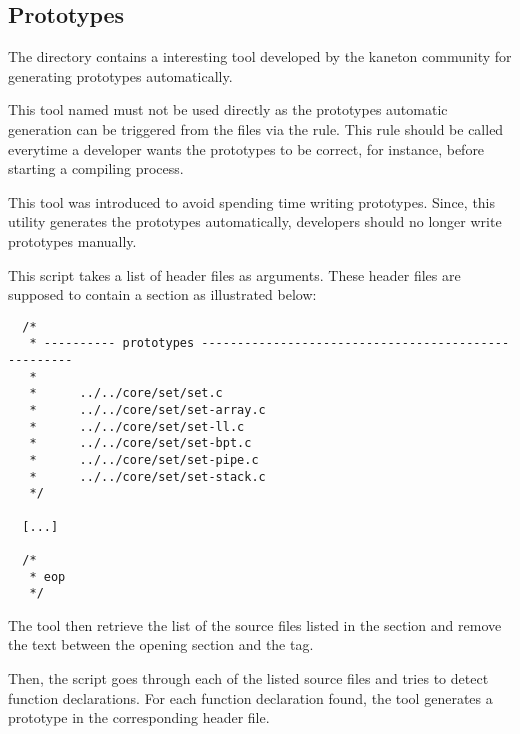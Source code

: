 %
%
%
%
%
%

%
%

\subsection{Prototypes}
\label{section:prototypes}

The  directory contains a interesting tool developed by
the kaneton community for generating  prototypes automatically.

This tool named  must not be used directly as the prototypes
automatic generation can be triggered from the  files via the
 rule. This rule should be called everytime a developer
wants the prototypes to be correct, for instance, before starting a compiling
process.

This tool was introduced to avoid spending time writing prototypes.
Since, this utility generates the prototypes automatically, developers
should no longer write prototypes manually.

This script takes a list of  header files as arguments. These header
files are supposed to contain a  section as illustrated
below:

\begin{verbatim}
  /*
   * ---------- prototypes ----------------------------------------------------
   *
   *      ../../core/set/set.c
   *      ../../core/set/set-array.c
   *      ../../core/set/set-ll.c
   *      ../../core/set/set-bpt.c
   *      ../../core/set/set-pipe.c
   *      ../../core/set/set-stack.c
   */

  [...]

  /*
   * eop
   */
\end{verbatim}

The  tool then retrieve the list of the  source files
listed in the  section and remove the text between
the  opening section and the  tag.

Then, the script goes through each of the listed source files and tries to
detect  function declarations. For each function declaration found,
the tool generates a prototype in the corresponding header file.

